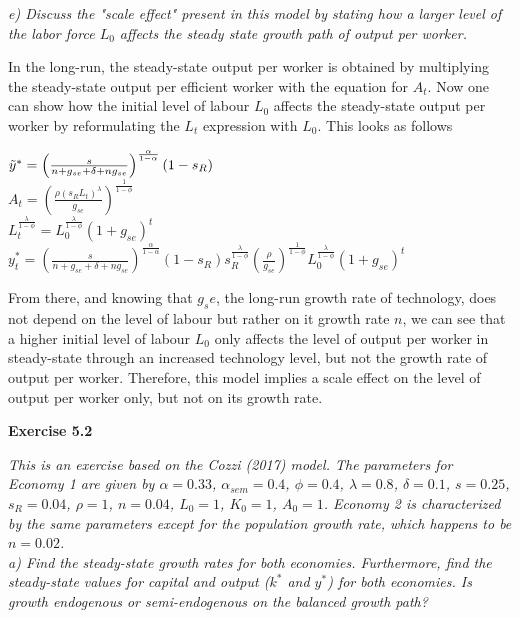 \documentclass[11pt]{article} %
\begin{document}
\pagebreak
\textit{e) Discuss the "scale effect" present in this model by stating how a larger level of the labor force $L_0$ affects the steady state growth path of output per worker.}\par

In the long-run, the steady-state output per worker is obtained by multiplying the steady-state output per efficient worker with the equation for $A_t$. Now one can show how the initial level of labour $L_0$ affects the steady-state output per worker by reformulating the $L_t$ expression with $L_0$. This looks as follows
\begin{center}
$\Tilde{y}^* = \left(\frac{s}{n+g_{se}+\delta+ng_{se}}\right)^{\frac{\alpha}{1-\alpha}}(1-s_{R})$ \\
$A_t = (\frac{\rho(s_{R}L_{t})^{\lambda}}{g_{se}})^{\frac{1}{1-\phi}}$\\
$L_t^{\frac{\lambda}{1-\phi}} = L_0^{\frac{\lambda}{1-\phi}}(1+g_{se})^t$\\
$y_t^* = \left(\frac{s}{n+g_{se}+\delta+ng_{se}}\right)^{\frac{\alpha}{1-\alpha}}(1-s_{R})s_R^{\frac{\lambda}{1-\phi}}\left(\frac{\rho}{g_{se}} \right)^{\frac{1}{1-\phi}}L_0^{\frac{\lambda}{1-\phi}}(1+g_{se})^t $\\
\end{center}
From there, and knowing that $g_se$, the long-run growth rate of technology, does not depend on the level of labour but rather on it growth rate $n$, we can see that a higher initial level of labour $L_0$ only affects the level of output per worker in steady-state through an increased technology level, but not the growth rate of output per worker. Therefore, this model implies a scale effect on the level of output per worker only, but not on its growth rate.





\pagebreak
\textbf{\Large{Exercise 5.2}}

\textit{This is an exercise based on the Cozzi (2017) model. The parameters for Economy 1 are given by $\alpha = 0.33$, $\alpha_{sem} = 0.4$, $\phi = 0.4$, $\lambda = 0.8$, $\delta=0.1$, $s=0.25$, $s_R =0.04$, $\rho=1$, $n = 0.04$, $L_0 = 1$, $K_0 = 1$, $A_0 = 1$. Economy 2 is characterized by the same parameters except for the population growth rate, which happens to be $n = 0.02$.}\\

\textit{a) Find the steady-state growth rates for both economies. Furthermore, find the steady-state values for capital and output ($k^*$ and $y^*$) for both economies. Is growth endogenous or semi-endogenous on the balanced growth path?}\par
\end{document}
